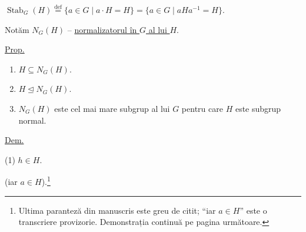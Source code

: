 \medskip
\noindent $\operatorname{Stab}_G(H)\overset{\mathrm{def}}{=}
\{a\in G\mid a\cdot H=H\}
=\{a\in G\mid aHa^{-1}=H\}$.

\medskip
\noindent Notăm $N_G(H)$ -- \underline{normalizatorul în $G$ al lui $H$}.

\bigskip
\noindent\underline{Prop.}
\begin{enumerate}
\item[(1)] $H\subseteq N_G(H)$.
\item[(2)] $H\trianglelefteq N_G(H)$.
\item[(3)] $N_G(H)$ este cel mai mare subgrup al lui $G$
 pentru care $H$ este subgrup normal.
\end{enumerate}

\medskip
\noindent\underline{Dem.}

\noindent (1) \quad $h\in H$.

\noindent (iar $a\in H$).\footnote{Ultima paranteză din manuscris este greu de citit; ``iar $a\in H$'' este o transcriere provizorie. Demonstrația continuă pe pagina următoare.}
